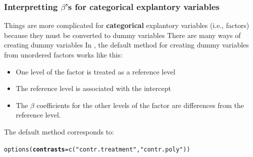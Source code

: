 \documentclass[color=usenames,dvipsnames]{beamer}\usepackage[]{graphicx}\usepackage[]{color}
\makeatletter
\newcommand{\hlstr}[1]{\textcolor[rgb]{0.749,0.012,0.012}{#1}}%
\newcommand{\hlstd}[1]{\textcolor[rgb]{0,0,0}{#1}}%
\newcommand{\hlkwc}[1]{\textcolor[rgb]{0,0,0}{\textbf{#1}}}%
\newcommand{\hlkwd}[1]{\textcolor[rgb]{0.004,0.004,0.506}{#1}}%
\newenvironment{kframe}{%
 \def\at@end@of@kframe{}%
 \ifinner\ifhmode%
  \def\at@end@of@kframe{\end{minipage}}%
  \begin{minipage}{\columnwidth}%
 \fi\fi%
 \def\FrameCommand##1{\hskip\@totalleftmargin \hskip-\fboxsep
 \colorbox{shadecolor}{##1}\hskip-\fboxsep
     \hskip-\linewidth \hskip-\@totalleftmargin \hskip\columnwidth}%
 \MakeFramed {\advance\hsize-\width
   \@totalleftmargin\z@ \linewidth\hsize
   \@setminipage}}%
 {\par\unskip\endMakeFramed%
 \at@end@of@kframe}
\newenvironment{knitrout}{}{} %
\newcommand{\inr}[1]{\colorbox{inlinecolor}{\texttt{#1}}}
\makeatother
\begin{document}
\begin{frame}[fragile]
  \frametitle{\small Interpretting $\beta$'s for categorical explantory
    variables}
  Things are more complicated for {\bf categorical} explantory
  variables (i.e., factors) because they must be converted to dummy
  variables
  \pause
  \vfill
  There are many ways of creating dummy variables
  \pause
  \vfill
  In \R, the default method for creating dummy variables from
  unordered factors works like
  this: %
  \begin{itemize}
    \item One level of the factor is treated as a \alert{reference level}
    \item The reference level is associated with the intercept
    \item The $\beta$ coefficients for the other levels of the factor
      are differences from the reference level.
  \end{itemize}
  \pause
  \vfill
  The default method corresponds to:
\begin{knitrout}\small
{}\color{fgcolor}\begin{kframe}
\begin{alltt}
\hlkwd{options}\hlstd{(}\hlkwc{contrasts}\hlstd{=}\hlkwd{c}\hlstd{(}\hlstr{"contr.treatment"}\hlstd{,}\hlstr{"contr.poly"}\hlstd{))}
\end{alltt}
\end{kframe}
\end{knitrout}
\end{frame}
\end{document}
